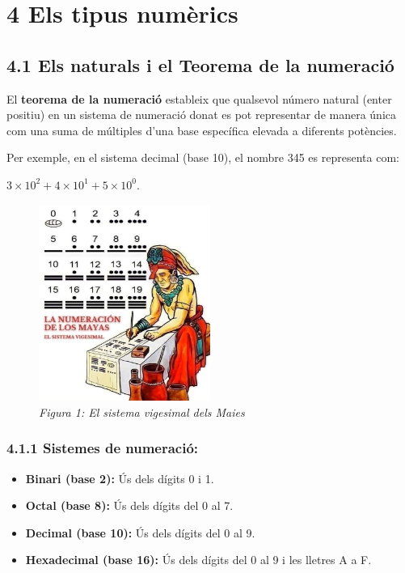 \documentclass[
  12 pt,
  a4paper,
]{article}
\providecommand{\tightlist}{%
  \setlength{\itemsep}{0pt}\setlength{\parskip}{0pt}}
\begin{document}
\section{4 Els tipus numèrics}\label{els-tipus-numuxe8rics}

\subsection{4.1 Els naturals i el Teorema de la
numeració}\label{els-naturals-i-el-teorema-de-la-numeraciuxf3}

El \textbf{teorema de la numeració} estableix que qualsevol número
natural (enter positiu) en un sistema de numeració donat es pot
representar de manera única com una suma de múltiples d'una base
específica elevada a diferents potències.

Per exemple, en el sistema decimal (base 10), el nombre 345 es
representa com:

\(3 \times 10^2 + 4 \times 10^1 + 5 \times 10^0\).

\begin{figure}
\centering
\includegraphics[width=0.5\textwidth,height=\textheight]{png/SistemaVigesimal.jpg}
\caption{\emph{Figura 1: El sistema vigesimal dels Maies}}
\end{figure}

\subsubsection{4.1.1 Sistemes de
numeració:}\label{sistemes-de-numeraciuxf3}

\begin{itemize}
\tightlist
\item
  \textbf{Binari (base 2):} Ús dels dígits 0 i 1.
\item
  \textbf{Octal (base 8):} Ús dels dígits del 0 al 7.
\item
  \textbf{Decimal (base 10):} Ús dels dígits del 0 al 9.
\item
  \textbf{Hexadecimal (base 16):} Ús dels dígits del 0 al 9 i les
  lletres A a F.
\end{itemize}
\end{document}
